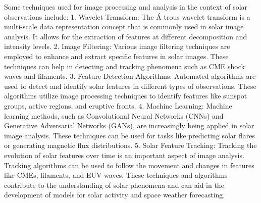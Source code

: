 Some techniques used for image processing and analysis in the context of solar observations include:
1. Wavelet Transform: The \'A trous wavelet transform is a multi-scale data representation concept that is commonly used in solar image analysis. It allows for the extraction of features at different decomposition and intensity levels.
2. Image Filtering: Various image filtering techniques are employed to enhance and extract specific features in solar images. These techniques can help in detecting and tracking phenomena such as CME shock waves and filaments.
3. Feature Detection Algorithms: Automated algorithms are used to detect and identify solar features in different types of observations. These algorithms utilize image processing techniques to identify features like sunspot groups, active regions, and eruptive fronts.
4. Machine Learning: Machine learning methods, such as Convolutional Neural Networks (CNNs) and Generative Adversarial Networks (GANs), are increasingly being applied in solar image analysis. These techniques can be used for tasks like predicting solar flares or generating magnetic flux distributions.
5. Solar Feature Tracking: Tracking the evolution of solar features over time is an important aspect of image analysis. Tracking algorithms can be used to follow the movement and changes in features like CMEs, filaments, and EUV waves.
These techniques and algorithms contribute to the understanding of solar phenomena and can aid in the development of models for solar activity and space weather forecasting.




















